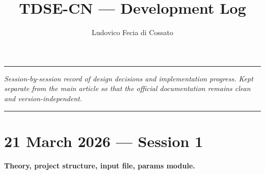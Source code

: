 \documentclass[a4paper,12pt]{article}
\title{{\bf \Large TDSE-CN — Development Log}}
\author{Ludovico Fecia di Cossato}
\date{}
\begin{document}
\maketitle
\thispagestyle{empty}

\noindent\rule{\textwidth}{0.4pt}
\vskip 2mm
\noindent\textit{Session-by-session record of design decisions and implementation
progress. Kept separate from the main article so that the official documentation
remains clean and version-independent.}
\vskip 2mm
\noindent\rule{\textwidth}{0.4pt}

\section*{21 March 2026 — Session 1}
\textbf{Theory, project structure, input file, params module.}
\end{document}
